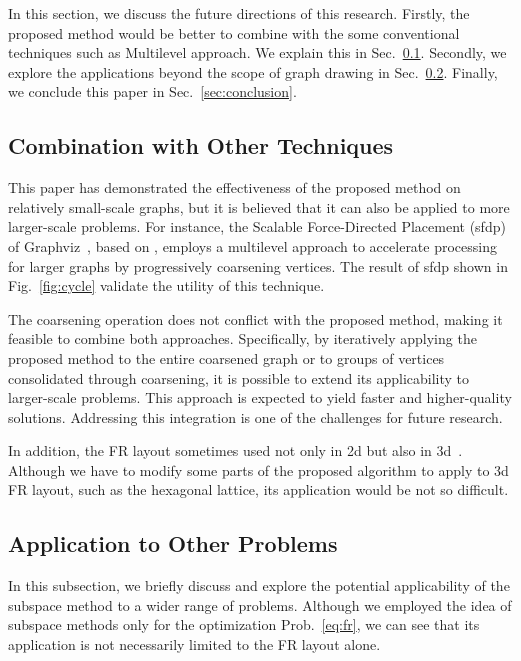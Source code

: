 \documentclass[dvipdfmx,10pt,journal,compsoc]{IEEEtran}
\begin{document}
In this section, we discuss the future directions of this research.
Firstly, the proposed method would be better to combine with the some conventional techniques such as Multilevel approach. We explain this in Sec.~\ref{sec:combination}.
Secondly, we explore the applications beyond the scope of graph drawing in Sec.~\ref{ssec:application}.
Finally, we conclude this paper in Sec.~\ref{sec:conclusion}.

\subsection{Combination with Other Techniques}\label{sec:combination}

This paper has demonstrated the effectiveness of the proposed method on relatively small-scale graphs, but it is believed that it can also be applied to more larger-scale problems.
For instance, the Scalable Force-Directed Placement (sfdp) of Graphviz~\cite{ellsonGraphvizOpenSource2002}, based on \cite{Hu2006EfficientHF}, employs a multilevel approach to accelerate processing for larger graphs by progressively coarsening vertices.
The result of sfdp shown in Fig.~\ref{fig:cycle} validate the utility of this technique.

The coarsening operation does not conflict with the proposed method, making it feasible to combine both approaches.
Specifically, by iteratively applying the proposed method to the entire coarsened graph or to groups of vertices consolidated through coarsening, it is possible to extend its applicability to larger-scale problems.
This approach is expected to yield faster and higher-quality solutions.
Addressing this integration is one of the challenges for future research.

In addition, the FR layout sometimes used not only in 2d but also in 3d~\cite{14738716211060306}. Although we have to modify some parts of the proposed algorithm to apply to 3d FR layout, such as the hexagonal lattice, its application would be not so difficult.

\subsection{Application to Other Problems}\label{ssec:application}

In this subsection, we briefly discuss and explore the potential applicability of the subspace method to a wider range of problems.
Although we employed the idea of subspace methods only for the optimization Prob.~\eqref{eq:fr}, we can see that its application is not necessarily limited to the FR layout alone.
\end{document}
